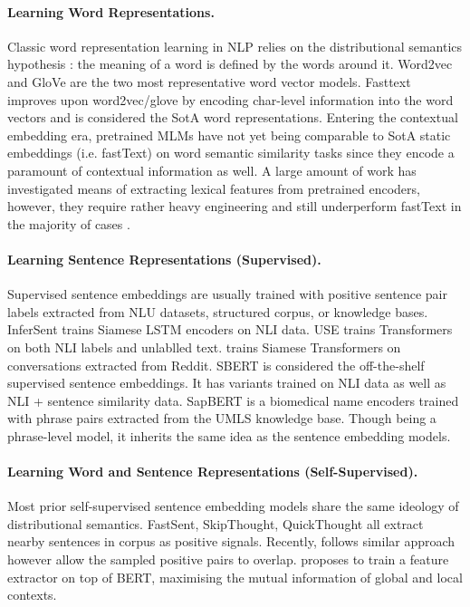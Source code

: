 \documentclass[11pt]{article}
\begin{document}
\paragraph{Learning Word Representations.}
Classic word representation learning in NLP relies on the distributional semantics hypothesis \citep{harris1954distributional}: the meaning of a word is defined by the words around it. Word2vec \citep{mikolov2013distributed,mikolov2013efficient} and GloVe \citep{pennington2014glove} are the two most representative word vector models. Fasttext improves upon word2vec/glove by encoding char-level information into the word vectors and is considered the SotA word representations. Entering the contextual embedding era, pretrained MLMs have not yet being comparable to SotA static embeddings (i.e. fastText) on word semantic similarity tasks since they encode a paramount of contextual information as well. A large amount of work has investigated means of extracting lexical features from pretrained encoders, however, they require rather heavy engineering and still underperform fastText in the majority of cases \citep{vulic-etal-2020-probing}.

\paragraph{Learning Sentence Representations (Supervised).}
Supervised sentence embeddings are usually trained with positive sentence pair labels extracted from NLU datasets, structured corpus, or knowledge bases. InferSent trains Siamese LSTM encoders on NLI data. USE trains Transformers on both NLI labels and unlablled text. \citep{yang2018learning} trains Siamese Transformers on conversations extracted from Reddit. SBERT is considered the off-the-shelf supervised sentence embeddings. It has variants trained on NLI data as well as NLI + sentence similarity data. SapBERT is a biomedical name encoders trained with phrase pairs extracted from the UMLS knowledge base. Though being a phrase-level model, it inherits the same idea as the sentence embedding models.

\paragraph{Learning Word and Sentence Representations (Self-Supervised).}
Most prior self-supervised sentence embedding models share the same ideology of distributional semantics. FastSent, SkipThought, QuickThought all extract nearby sentences in corpus as positive signals. Recently, \citep{Giorgi2020DeCLUTRDC} follows similar approach however allow the sampled positive pairs to overlap. \citep{zhang2020unsupervised} proposes to train a feature extractor on top of BERT, maximising the mutual information of global and local contexts. 
\end{document}
